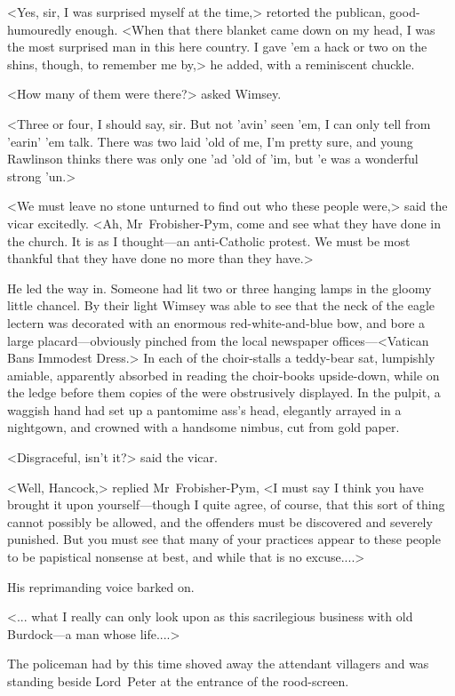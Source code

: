 <Yes, sir, I was surprised myself at the time,> retorted the publican, good-humouredly enough. <When that there blanket came down on my head, I was the most surprised man in this here country. I gave 'em a hack or two on the shins, though, to remember me by,> he added, with a reminiscent chuckle.

<How many of them were there?> asked Wimsey.

<Three or four, I should say, sir. But not 'avin' seen 'em, I can only tell from 'earin' 'em talk. There was two laid 'old of me, I'm pretty sure, and young Rawlinson thinks there was only one 'ad 'old of 'im, but 'e was a wonderful strong 'un.>

<We must leave no stone unturned to find out who these people were,> said the vicar excitedly. <Ah, Mr~Frobisher-Pym, come and see what they have done in the church. It is as I thought—an anti-Catholic protest. We must be most thankful that they have done no more than they have.>

He led the way in. Someone had lit two or three hanging lamps in the gloomy little chancel. By their light Wimsey was able to see that the neck of the eagle lectern was decorated with an enormous red-white-and-blue bow, and bore a large placard—obviously pinched from the local newspaper offices—<Vatican Bans Immodest Dress.> In each of the choir-stalls a teddy-bear sat, lumpishly amiable, apparently absorbed in reading the choir-books upside-down, while on the ledge before them copies of the  were obstrusively displayed. In the pulpit, a waggish hand had set up a pantomime ass's head, elegantly arrayed in a nightgown, and crowned with a handsome nimbus, cut from gold paper.

<Disgraceful, isn't it?> said the vicar.

<Well, Hancock,> replied Mr~Frobisher-Pym, <I must say I think you have brought it upon yourself—though I quite agree, of course, that this sort of thing cannot possibly be allowed, and the offenders must be discovered and severely punished. But you must see that many of your practices appear to these people to be papistical nonsense at best, and while that is no excuse....>

His reprimanding voice barked on.

<... what I really can only look upon as this sacrilegious business with old Burdock—a man whose life....>

The policeman had by this time shoved away the attendant villagers and was standing beside Lord~Peter at the entrance of the rood-screen.

